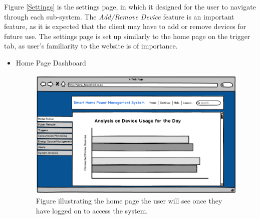 \documentclass[10pt,twocolumn]{witseiepaper}
\begin{document}
	Figure \ref{Settings} is the settings page, in which it designed for the user to navigate through each sub-system. The \textit{Add/Remove Device} feature is an important feature, as it is expected that the client may have to add or remove devices for future use. The settings page is set up similarly to the home page on the trigger tab, as user's  familiarity to the website is of importance.
	\begin{itemize}
		\item Home Page Dashboard
		\begin{figure}[H]
			\centering
			\includegraphics[width=\linewidth]{Home_Page.png}
			\caption{Figure illustrating the home page the user will see once they have logged on to access the system.}
			\label{Home_Dashboard}
		\end{figure}
		

\end{itemize}
\end{document}
